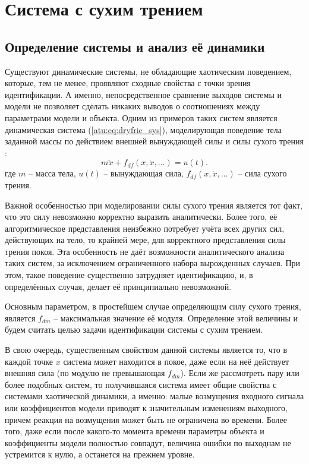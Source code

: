 
\FloatBarrier
\section{Система с сухим трением} %
\label{atu:sect:fric}


\subsection{Определение системы и анализ её динамики} %


Существуют динамические системы, не обладающие хаотическим поведением,
которые, тем не менее, проявляют сходные свойства с точки зрения идентификации.
А именно, непосредственное сравнение выходов системы и модели не позволяет
сделать никаких выводов о соотношениях между параметрами модели и объекта.
Одним из примеров таких систем является динамическая система (\ref{atu:eq:dryfric_sys}),
моделирующая поведение тела заданной массы по действием внешней вынуждающей силы
и силы сухого трения
\cite{berger_friction,atu_asau11,osn_dyn_prom_robot,borcov}:
%
\begin{equation}
  m \ddot{x} + f_{df}( x, \dot{x}, \ldots)  = u(t).
\label{atu:eq:dryfric_sys}
\end{equation}
%
где
$m$ -- масса тела,
$u(t)$ -- вынуждающая сила,
$ f_{df}( x, \dot{x}, \ldots)  $ -- сила сухого трения.

Важной особенностью при моделировании силы сухого трения является тот факт,
что это силу невозможно корректно выразить аналитически. Более того,
её алгоритмическое представления неизбежно потребует учёта всех других сил,
действующих на тело, то крайней мере, для корректного представления
силы трения покоя. Эта особенность не даёт возможности
аналитического анализа таких систем, за исключением ограниченного набора
вырожденных случаев. При этом, такое поведение существенно затрудняет идентификацию,
и, в определённых случая, делает её принципиально невозможной.

Основным параметром, в простейшем случае определяющим силу сухого
трения, является $f_{dm}$ -- максимальная значение её модуля.
Определение этой величины и будем считать целью задачи идентификации
системы с сухим трением.

В свою очередь, существенным свойством данной системы является то, что в каждой точке \(x\)
система может находится в покое, даже если на неё действует
внешняя сила (по модулю не превышающая $f_{dm}$).
Если же рассмотреть пару или более подобных систем,
то получившаяся система имеет общие свойства с системами
хаотической динамики, а именно: малые возмущения входного сигнала
или коэффициентов модели приводят к значительным изменениям
выходного, причем реакция на возмущения может быть
не ограничена во времени.
Более того, даже если после какого-то момента времени
параметры объекта и коэффициенты модели полностью совпадут,
величина ошибки по выходнам не устремится к нулю, а останется на прежнем уровне.

